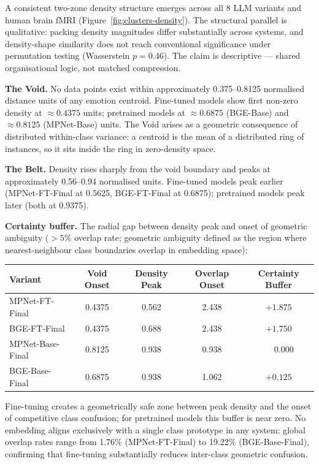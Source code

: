 \documentclass{article}
\begin{document}
A consistent two-zone density structure emerges across all 8 LLM variants and
human brain fMRI (Figure~\ref{fig:clusters-density}).
The structural parallel is qualitative: packing density magnitudes differ substantially
across systems, and density-shape similarity does not reach conventional significance
under permutation testing (Wasserstein $p\!=\!0.46$).
The claim is descriptive --- shared organisational logic, not matched compression.

\textbf{The Void.}
No data points exist within approximately 0.375--0.8125 normalised distance units of
any emotion centroid.
Fine-tuned models show first non-zero density at $\approx\!0.4375$ units;
pretrained models at $\approx\!0.6875$ (BGE-Base) and $\approx\!0.8125$ (MPNet-Base) units.
The Void arises as a geometric consequence of distributed within-class variance:
a centroid is the mean of a distributed ring of instances, so it sits inside the ring
in zero-density space.

\textbf{The Belt.}
Density rises sharply from the void boundary and peaks at approximately 0.56--0.94
normalised units.
Fine-tuned models peak earlier (MPNet-FT-Final at 0.5625, BGE-FT-Final at 0.6875);
pretrained models peak later (both at 0.9375).

\textbf{Certainty buffer.}
The radial gap between density peak and onset of geometric ambiguity
($>\!5\%$ overlap rate; geometric ambiguity defined as the region where
nearest-neighbour class boundaries overlap in embedding space):

\begin{center}
\small
\begin{tabular}{lcccc}
\toprule
Variant & Void Onset & Density Peak & Overlap Onset & Certainty Buffer \\
\midrule
MPNet-FT-Final  & 0.4375 & 0.562 & 2.438 & $+1.875$ \\
BGE-FT-Final    & 0.4375 & 0.688 & 2.438 & $+1.750$ \\
MPNet-Base-Final& 0.8125 & 0.938 & 0.938 & $\phantom{+}0.000$ \\
BGE-Base-Final  & 0.6875 & 0.938 & 1.062 & $+0.125$ \\
\bottomrule
\end{tabular}
\end{center}

Fine-tuning creates a geometrically safe zone between peak density and the onset of
competitive class confusion; for pretrained models this buffer is near zero.
No embedding aligns exclusively with a single class prototype in any system:
global overlap rates range from 1.76\% (MPNet-FT-Final) to 19.22\% (BGE-Base-Final),
confirming that fine-tuning substantially reduces inter-class geometric confusion.
\end{document}
